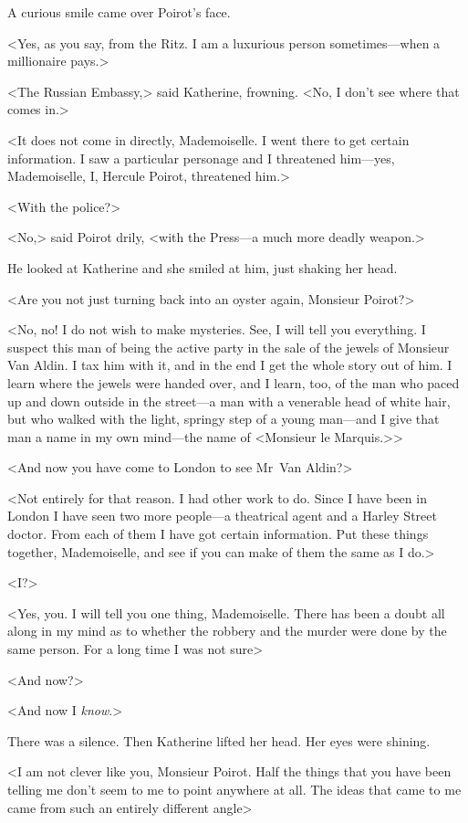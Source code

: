 A curious smile came over Poirot's face.

<Yes, as you say, from the Ritz. I am a luxurious person sometimes—when a millionaire pays.>

<The Russian Embassy,> said Katherine, frowning. <No, I don't see where that comes in.>

<It does not come in directly, Mademoiselle. I went there to get certain information. I saw a particular personage and I threatened him—yes, Mademoiselle, I, Hercule Poirot, threatened him.>

<With the police?>

<No,> said Poirot drily, <with the Press—a much more deadly weapon.>

He looked at Katherine and she smiled at him, just shaking her head.

<Are you not just turning back into an oyster again, Monsieur Poirot?>

<No, no! I do not wish to make mysteries. See, I will tell you everything. I suspect this man of being the active party in the sale of the jewels of Monsieur Van Aldin. I tax him with it, and in the end I get the whole story out of him. I learn where the jewels were handed over, and I learn, too, of the man who paced up and down outside in the street—a man with a venerable head of white hair, but who walked with the light, springy step of a young man—and I give that man a name in my own mind—the name of <Monsieur le Marquis.>>

<And now you have come to London to see Mr~Van Aldin?>

<Not entirely for that reason. I had other work to do. Since I have been in London I have seen two more people—a theatrical agent and a Harley Street doctor. From each of them I have got certain information. Put these things together, Mademoiselle, and see if you can make of them the same as I do.>

<I?>

<Yes, you. I will tell you one thing, Mademoiselle. There has been a doubt all along in my mind as to whether the robbery and the murder were done by the same person. For a long time I was not sure\longdash>

<And now?>

<And now I \emph{know}.>

There was a silence. Then Katherine lifted her head. Her eyes were shining.

<I am not clever like you, Monsieur Poirot. Half the things that you have been telling me don't seem to me to point anywhere at all. The ideas that came to me came from such an entirely different angle\longdash>

